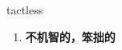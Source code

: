 
\begin{frame}
{\huge tactless}
\begin{center}
\begin{enumerate}\Large
  \item \textbf{不机智的，笨拙的}
\end{enumerate}
\end{center}
\end{frame}
